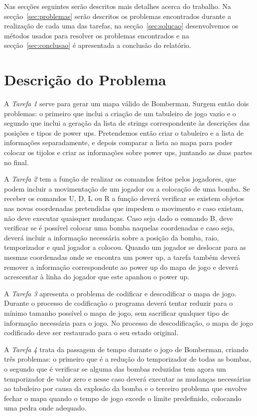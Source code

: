 \documentclass[a4paper]{article}
\begin{document}
Nas secções seguintes serão descritos mais detalhes acerca do trabalho. Na
secção~\ref{sec:problemas} serão descritos os problemas encontrados durante 
a realização de cada uma das tarefas, na secção~\ref{sec:solucao} 
desenvolvemos os métodos usados para resolver os problemas encontrados e 
na secção~\ref{sec:conclusao} é apresentada a conclusão do relatório.

\section{Descrição do Problema}
\label{sec:problema}

A \emph{Tarefa 1} serve para gerar um mapa válido de Bomberman. Surgem então
dois problemas: o primeiro que inclui a criação de um tabuleiro de
jogo vazio e o segundo que inclui a geração da lista de strings 
correspondente às descrições das posições e tipos de power ups.
Pretendemos então criar o tabuleiro e a lista de informações separadamente,
e depois comparar a lista ao mapa para poder colocar os tijolos e criar 
as informações sobre power ups, juntando as duas partes no final.

A \emph{Tarefa 2} tem a função de realizar os comandos feitos pelos jogadores, 
que podem incluir a movimentação de um jogador ou a colocação de uma 
bomba. Se receber os comandos U, D, L ou R a função deverá verificar 
se existem objetos nas novas coordenadas pretendidas que impedem o 
movimento e caso existam, não deve executar quaisquer mudanças.
Caso seja dado o comando B, deve verificar se é possível colocar 
uma bomba naquelas coordenadas e caso seja, deverá incluir a informação 
necessária sobre a posição da bomba, raio, temporizador e qual jogador 
a colocou. Quando um jogador se deslocar para as mesmas coordenadas onde
se encontra um power up, a tarefa também deverá remover a informação 
correspondente ao power up do mapa de jogo e deverá acrescentar à linha
do jogador que este apanhou o power up.

A \emph{Tarefa 3} apresenta o problema de codificar e descodificar o mapa 
de jogo. Durante o processo de codificação o programa deverá tentar 
reduzir para o mínimo tamanho possível o mapa de jogo, sem sacrificar 
qualquer tipo de informação necessária para o jogo. No processo de 
descodificação, o mapa de jogo codificado deve ser restaurado para 
o seu estado original.

A \emph{Tarefa 4} trata da passagem de tempo durante o jogo de Bomberman,
criando três problemas: o primeiro que é a redução do temporizador 
de todas as bombas, o segundo que é verificar se alguma das bombas 
reduzidas tem agora um temporizador de valor zero e nesse caso 
deverá executar as mudanças necessárias ao tabuleiro por causa 
da explosão da bomba e o terceiro problema que envolve fechar o 
mapa quando o tempo de jogo excede o limite predefinido, colocando 
uma pedra onde adequado.
\end{document}
